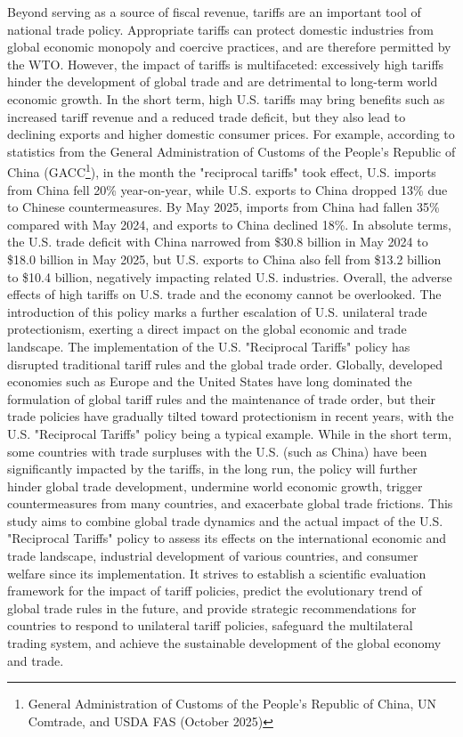\documentclass{apmcmthesis}
\begin{document}
Beyond serving as a source of fiscal revenue, tariffs are an important tool of national trade policy. Appropriate tariffs can protect domestic industries from global economic monopoly and coercive practices, and are therefore permitted by the WTO. However, the impact of tariffs is multifaceted: excessively high tariffs hinder the development of global trade and are detrimental to long-term world economic growth. In the short term, high U.S. tariffs may bring benefits such as increased tariff revenue and a reduced trade deficit, but they also lead to declining exports and higher domestic consumer prices. For example, according to statistics from the General Administration of Customs of the People's Republic of China (GACC\footnote{\cite{GACC} General Administration of Customs of the People's Republic of China, UN Comtrade, and USDA FAS (October 2025)}), in the month the "reciprocal tariffs" took effect, U.S. imports from China fell 20\% year-on-year, while U.S. exports to China dropped 13\% due to Chinese countermeasures. By May 2025, imports from China had fallen 35\% compared with May 2024, and exports to China declined 18\%. In absolute terms, the U.S. trade deficit with China narrowed from \$30.8 billion in May 2024 to \$18.0 billion in May 2025, but U.S. exports to China also fell from \$13.2 billion to \$10.4 billion, negatively impacting related U.S. industries. Overall, the adverse effects of high tariffs on U.S. trade and the economy cannot be overlooked. The introduction of this policy marks a further escalation of U.S. unilateral trade protectionism, exerting a direct impact on the global economic and trade landscape. The implementation of the U.S. "Reciprocal Tariffs" policy has disrupted traditional tariff rules and the global trade order. Globally, developed economies such as Europe and the United States have long dominated the formulation of global tariff rules and the maintenance of trade order, but their trade policies have gradually tilted toward protectionism in recent years, with the U.S. "Reciprocal Tariffs" policy being a typical example. While in the short term, some countries with trade surpluses with the U.S. (such as China) have been significantly impacted by the tariffs, in the long run, the policy will further hinder global trade development, undermine world economic growth, trigger countermeasures from many countries, and exacerbate global trade frictions. This study aims to combine global trade dynamics and the actual impact of the U.S. "Reciprocal Tariffs" policy to assess its effects on the international economic and trade landscape, industrial development of various countries, and consumer welfare since its implementation. It strives to establish a scientific evaluation framework for the impact of tariff policies, predict the evolutionary trend of global trade rules in the future, and provide strategic recommendations for countries to respond to unilateral tariff policies, safeguard the multilateral trading system, and achieve the sustainable development of the global economy and trade.
\end{document}
